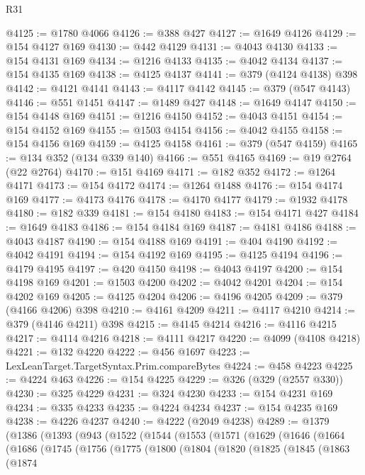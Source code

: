 \begin{lexlean}{R31}
\begin{coremodule}
@4125 := @1780 @4066
@4126 := @388 @427
@4127 := @1649 @4126
@4129 := @154 @4127 @169
@4130 := @442 @4129
@4131 := @4043 @4130
@4133 := @154 @4131 @169
@4134 := @1216 @4133
@4135 := @4042 @4134
@4137 := @154 @4135 @169
@4138 := @4125 @4137
@4141 := @379 (@4124 @4138) @398
@4142 := @4121 @4141
@4143 := @4117 @4142
@4145 := @379 (@547 @4143)
@4146 := @551 @1451
@4147 := @1489 @427
@4148 := @1649 @4147
@4150 := @154 @4148 @169
@4151 := @1216 @4150
@4152 := @4043 @4151
@4154 := @154 @4152 @169
@4155 := @1503 @4154
@4156 := @4042 @4155
@4158 := @154 @4156 @169
@4159 := @4125 @4158
@4161 := @379 (@547 @4159)
@4165 := @134 @352 (@134 @339 @140)
@4166 := @551 @4165
@4169 := @19 @2764 (@22 @2764)
@4170 := @151 @4169
@4171 := @182 @352
@4172 := @1264 @4171
@4173 := @154 @4172
@4174 := @1264 @1488
@4176 := @154 @4174 @169
@4177 := @4173 @4176
@4178 := @4170 @4177
@4179 := @1932 @4178
@4180 := @182 @339
@4181 := @154 @4180
@4183 := @154 @4171 @427
@4184 := @1649 @4183
@4186 := @154 @4184 @169
@4187 := @4181 @4186
@4188 := @4043 @4187
@4190 := @154 @4188 @169
@4191 := @404 @4190
@4192 := @4042 @4191
@4194 := @154 @4192 @169
@4195 := @4125 @4194
@4196 := @4179 @4195
@4197 := @420 @4150
@4198 := @4043 @4197
@4200 := @154 @4198 @169
@4201 := @1503 @4200
@4202 := @4042 @4201
@4204 := @154 @4202 @169
@4205 := @4125 @4204
@4206 := @4196 @4205
@4209 := @379 (@4166 @4206) @398
@4210 := @4161 @4209
@4211 := @4117 @4210
@4214 := @379 (@4146 @4211) @398
@4215 := @4145 @4214
@4216 := @4116 @4215
@4217 := @4114 @4216
@4218 := @4111 @4217
@4220 := @4099 (@4108 @4218)
@4221 := @132 @4220
@4222 := @456 @1697
@4223 := LexLeanTarget.TargetSyntax.Prim.compareBytes
@4224 := @458 @4223
@4225 := @4224 @463
@4226 := @154 @4225
@4229 := @326 (@329 (@2557 @330))
@4230 := @325 @4229
@4231 := @324 @4230
@4233 := @154 @4231 @169
@4234 := @335 @4233
@4235 := @4224 @4234
@4237 := @154 @4235 @169
@4238 := @4226 @4237
@4240 := @4222 (@2049 @4238)
@4289 := @1379
    (@1386
      (@1393
        (@943
          (@1522
            (@1544
              (@1553
                (@1571
                  (@1629
                    (@1646
                      (@1664
                        (@1686
                          (@1745
                            (@1756
                              (@1775
                                (@1800
                                  (@1804
                                    (@1820
                                      (@1825
                                        (@1845
                                          (@1863
                                            (@1874

\end{coremodule}
\end{lexlean}
